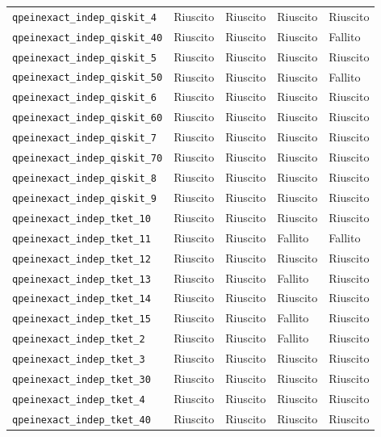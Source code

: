\begin{longtable}{>{\raggedright\arraybackslash}p{6.8cm}>{\centering\arraybackslash}p{2.0cm}>{\centering\arraybackslash}p{2.0cm}>{\centering\arraybackslash}p{2.0cm}>{\centering\arraybackslash}p{2.0cm}}
\nolinkurl{qpeinexact_indep_qiskit_4} & Riuscito & Riuscito & Riuscito & Riuscito \\
\nolinkurl{qpeinexact_indep_qiskit_40} & Riuscito & Riuscito & Riuscito & Fallito \\
\nolinkurl{qpeinexact_indep_qiskit_5} & Riuscito & Riuscito & Riuscito & Riuscito \\
\nolinkurl{qpeinexact_indep_qiskit_50} & Riuscito & Riuscito & Riuscito & Fallito \\
\nolinkurl{qpeinexact_indep_qiskit_6} & Riuscito & Riuscito & Riuscito & Riuscito \\
\nolinkurl{qpeinexact_indep_qiskit_60} & Riuscito & Riuscito & Riuscito & Riuscito \\
\nolinkurl{qpeinexact_indep_qiskit_7} & Riuscito & Riuscito & Riuscito & Riuscito \\
\nolinkurl{qpeinexact_indep_qiskit_70} & Riuscito & Riuscito & Riuscito & Riuscito \\
\nolinkurl{qpeinexact_indep_qiskit_8} & Riuscito & Riuscito & Riuscito & Riuscito \\
\nolinkurl{qpeinexact_indep_qiskit_9} & Riuscito & Riuscito & Riuscito & Riuscito \\
\nolinkurl{qpeinexact_indep_tket_10} & Riuscito & Riuscito & Riuscito & Riuscito \\
\nolinkurl{qpeinexact_indep_tket_11} & Riuscito & Riuscito & Fallito & Fallito \\
\nolinkurl{qpeinexact_indep_tket_12} & Riuscito & Riuscito & Riuscito & Riuscito \\
\nolinkurl{qpeinexact_indep_tket_13} & Riuscito & Riuscito & Fallito & Riuscito \\
\nolinkurl{qpeinexact_indep_tket_14} & Riuscito & Riuscito & Riuscito & Riuscito \\
\nolinkurl{qpeinexact_indep_tket_15} & Riuscito & Riuscito & Fallito & Riuscito \\
\nolinkurl{qpeinexact_indep_tket_2} & Riuscito & Riuscito & Fallito & Riuscito \\
\nolinkurl{qpeinexact_indep_tket_3} & Riuscito & Riuscito & Riuscito & Riuscito \\
\nolinkurl{qpeinexact_indep_tket_30} & Riuscito & Riuscito & Riuscito & Riuscito \\
\nolinkurl{qpeinexact_indep_tket_4} & Riuscito & Riuscito & Riuscito & Riuscito \\
\nolinkurl{qpeinexact_indep_tket_40} & Riuscito & Riuscito & Riuscito & Riuscito \\

\end{longtable}

